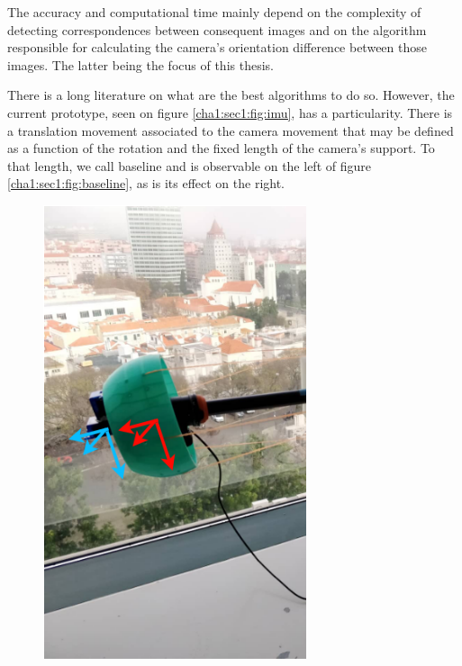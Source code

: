 The accuracy and computational time mainly depend on the complexity of detecting correspondences between consequent images and on the algorithm responsible for calculating the camera's orientation difference between those images. The latter being the focus of this thesis.

There is a long literature on what are the best algorithms to do so. However, the current prototype, seen on figure \ref{cha1:sec1:fig:imu}, has a particularity. There is a translation movement associated to the camera movement that may be defined as a function of the rotation and the fixed length of the camera’s support. To that length, we call baseline and is observable on the left of figure \ref{cha1:sec1:fig:baseline}, as is its effect on the right.

\begin{figure}[ht]
	\centering
	\begin{minipage}[b]{0.2\linewidth}
		\centering
		\includegraphics[width=\textwidth]{images/baselinephoto.png}

\end{minipage}
\end{figure}
